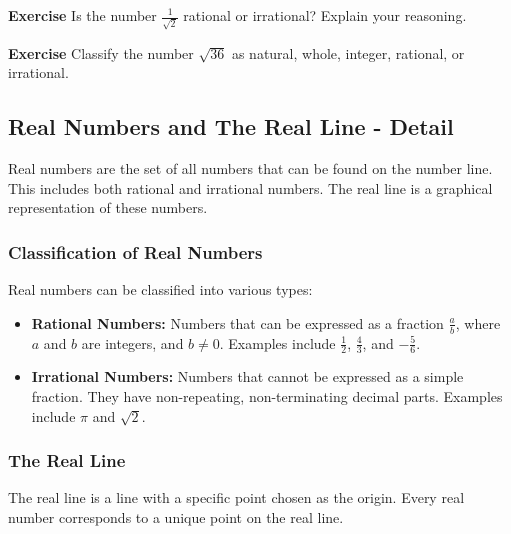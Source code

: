 \documentclass[a4paper,12pt]{book}
\newenvironment{exercise}[1][]
  {\par\medskip\noindent\textbf{Exercise #1} \rmfamily}
  {\medskip}
\begin{document}
\begin{exercise}
Is the number \( \frac{1}{\sqrt{2}} \) rational or irrational? Explain your reasoning.
\end{exercise}


\begin{exercise}
Classify the number \( \sqrt{36} \) as natural, whole, integer, rational, or irrational.
\end{exercise}




\subsection{Real Numbers and The Real Line - Detail}
\label{subsec:real_nums_real_line_detail}
Real numbers are the set of all numbers that can be found on the number line. This includes both rational and irrational numbers. The real line is a graphical representation of these numbers.


\subsubsection{Classification of Real Numbers}
Real numbers can be classified into various types:


\begin{itemize}
    \item \textbf{Rational Numbers:} Numbers that can be expressed as a fraction \( \frac{a}{b} \), where \( a \) and \( b \) are integers, and \( b \neq 0 \). Examples include \( \frac{1}{2} \), \( \frac{4}{3} \), and \( -\frac{5}{6} \).
    \item \textbf{Irrational Numbers:} Numbers that cannot be expressed as a simple fraction. They have non-repeating, non-terminating decimal parts. Examples include \( \pi \) and \( \sqrt{2} \).
\end{itemize}


\subsubsection{The Real Line}
The real line is a line with a specific point chosen as the origin. Every real number corresponds to a unique point on the real line.


\begin{center}
\end{center}
\end{document}
